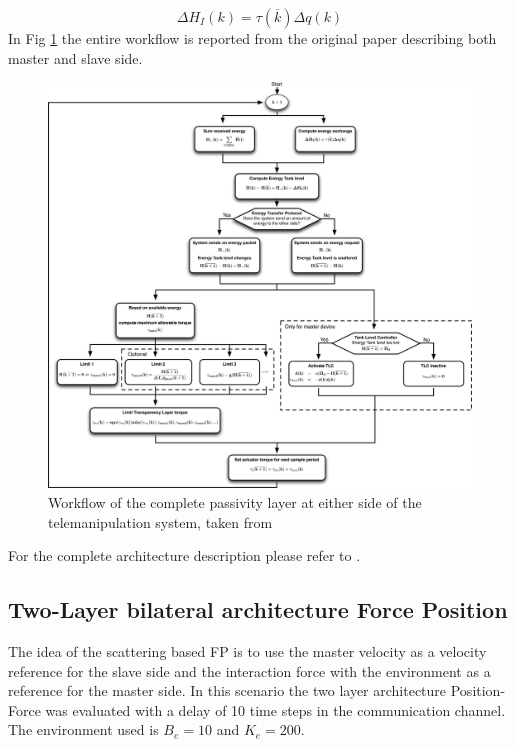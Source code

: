 \documentclass[a4paper,12pt]{article}
\begin{document}
\[
    \Delta H_I(k) = \tau(\overline{k}) \Delta q(k)
\]
In Fig \ref{fig:architecture} the entire workflow is reported from the original paper describing both master and slave side.
\begin{figure}[H]
    \begin{center}
        \hspace*{-2.2cm}
        \includegraphics[scale=0.28]{images/architecture.png}
    \end{center}
    \caption{Workflow of the complete passivity layer at either side of the telemanipulation system, taken from \cite{Franken11}}
    \label{fig:architecture}
\end{figure}

For the complete architecture description please refer to \cite{Franken11}.

\subsection{Two-Layer bilateral architecture Force Position}
The idea of the scattering based FP is to use the master velocity as a velocity reference for the slave side and the interaction force with the environment as a reference for the master side. In this scenario the two layer architecture Position-Force was evaluated with a delay of 10 time steps in the communication channel. The environment used is $B_e = 10$ and $K_e = 200$. 
\end{document}
